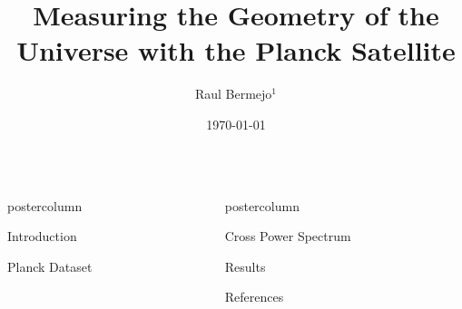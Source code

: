 \documentclass{beamer}
\title{\huge Measuring the Geometry of the Universe with the Planck Satellite}
\author{Raul Bermejo$^{1}$}
\institute[UniMelb]{$^{1}$School of Physics, University of Melbourne}
\date{\today}
\newlength{\columnheight}
\begin{document}
\begin{frame}
\begin{columns}
	\begin{column}{.4\textwidth}
		\begin{beamercolorbox}[center]{postercolumn}
			\begin{minipage}{.98\textwidth}  %
				\parbox[t][\columnheight]{\textwidth}{ %
					\begin{myblock}{Introduction}	
				
						
					\end{myblock}\vfill
					
					
					\begin{myblock}{Planck Dataset}
					
					\end{myblock}\vfill
		}\end{minipage}\end{beamercolorbox}
	\end{column}
	
	
	\begin{column}{.6\textwidth}
		\begin{beamercolorbox}[center]{postercolumn}
			\begin{minipage}{.98\textwidth} %
				\parbox[t][\columnheight]{\textwidth}{ %
					\begin{myblock}{Cross Power Spectrum}
					
					
					\end{myblock}\vfill
					
					
					\begin{myblock}{Results}
					
					\end{myblock}\vfill
					
					
					
					\begin{myblock}{References}
						\footnotesize
						
						
					\end{myblock}\vfill
		}\end{minipage}\end{beamercolorbox}
	\end{column}
\end{columns}
\end{frame}
\end{document}
